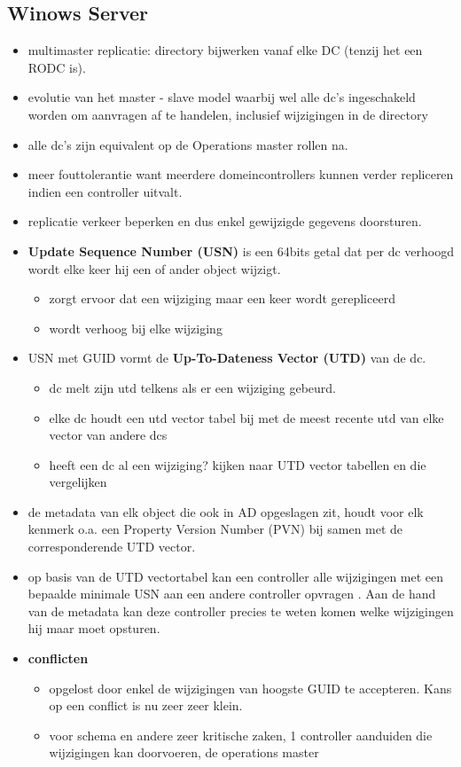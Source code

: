 \subsection{Winows Server}
\begin{itemize}
\item multimaster replicatie: directory bijwerken vanaf elke DC (tenzij het een RODC is).
\item evolutie van het master - slave model waarbij wel alle dc's ingeschakeld worden om aanvragen af te handelen, inclusief wijzigingen in de directory
\item alle dc's zijn equivalent op de Operations master rollen na.
\item meer fouttolerantie want meerdere domeincontrollers kunnen verder repliceren indien een controller uitvalt.
\item replicatie verkeer beperken en dus enkel gewijzigde gegevens doorsturen.
\item \textbf{Update Sequence Number (USN)} is een 64bits getal dat per dc verhoogd wordt elke keer hij een of ander object wijzigt. 
\begin{itemize}
\item zorgt ervoor dat een wijziging maar een keer wordt gerepliceerd
\item wordt verhoog bij elke wijziging
\end{itemize}
\clearpage
\item USN met GUID vormt de \textbf{Up-To-Dateness Vector (UTD)} van de dc.
\begin{itemize}
\item dc melt zijn utd telkens als er een wijziging gebeurd.
\item elke dc houdt een utd vector tabel bij met de meest recente utd van elke vector van andere dcs
\item heeft een dc al een wijziging? kijken naar UTD vector tabellen en die vergelijken
\end{itemize}
\item de metadata van elk object die ook in AD opgeslagen zit, houdt voor elk kenmerk o.a. een Property Version Number (PVN) bij samen met de corresponderende UTD vector.
\item op basis van de UTD vectortabel kan een controller alle wijzigingen met een bepaalde minimale USN aan een andere controller opvragen . Aan de hand van de metadata kan deze controller precies te weten komen welke wijzigingen hij maar moet opsturen.

\item \textbf{conflicten}
\begin{itemize}
\item opgelost door enkel de wijzigingen van hoogste GUID te accepteren. Kans op een conflict is nu zeer zeer klein.
\item voor schema en andere zeer kritische zaken, 1 controller aanduiden die wijzigingen kan doorvoeren, de operations master
\end{itemize}


\end{itemize}
